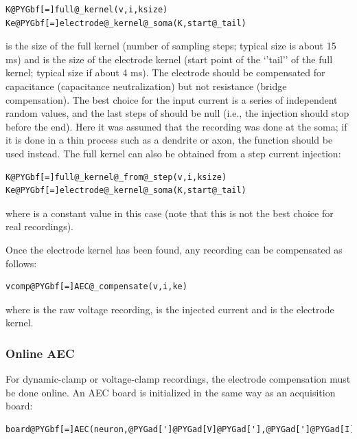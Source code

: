 \documentclass[letterpaper,10pt,english]{manual}
\begin{document}
\begin{Verbatim}[commandchars=@\[\]]
K@PYGbf[=]full@_kernel(v,i,ksize)
Ke@PYGbf[=]electrode@_kernel@_soma(K,start@_tail)
\end{Verbatim}

 is the size of the full kernel (number of sampling steps; typical size is
about 15 ms) and  is the size of the electrode kernel (start point
of the `'tail'' of the full kernel; typical size if about 4 ms). The electrode
should be compensated for capacitance (capacitance neutralization)
but not resistance (bridge compensation). The best choice for the
input current is a series of independent random values, and the last 
steps of  should be null (i.e., the injection should stop before the end).
Here it was assumed that the recording was done at the soma; if it is done in a thin
process such as a dendrite or axon, the function 
should be used instead. The full kernel can also be obtained from a step current
injection:

\begin{Verbatim}[commandchars=@\[\]]
K@PYGbf[=]full@_kernel@_from@_step(v,i,ksize)
Ke@PYGbf[=]electrode@_kernel@_soma(K,start@_tail)
\end{Verbatim}

where  is a constant value in this case (note that this is not the best choice for
real recordings).

Once the electrode kernel has been found, any recording can be compensated as follows:

\begin{Verbatim}[commandchars=@\[\]]
vcomp@PYGbf[=]AEC@_compensate(v,i,ke)
\end{Verbatim}

where  is the raw voltage recording,  is the injected current
and  is the electrode kernel.


\subsubsection{Online AEC}

For dynamic-clamp or voltage-clamp recordings, the electrode compensation must be
done online. An AEC board is initialized in the same way as an acquisition board:

\begin{Verbatim}[commandchars=@\[\]]
board@PYGbf[=]AEC(neuron,@PYGad[']@PYGad[V]@PYGad['],@PYGad[']@PYGad[I]@PYGad['],clock)
\end{Verbatim}
\end{document}
